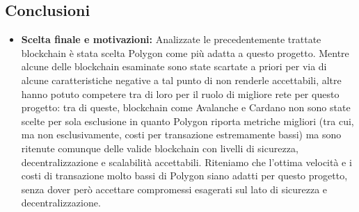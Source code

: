 \documentclass[a4paper, 12pt]{article}
\begin{document}
\subsection*{Conclusioni}
\begin{itemize}

    \item \textbf{Scelta finale e motivazioni: }
    Analizzate le precedentemente trattate blockchain è stata scelta Polygon come più adatta a questo progetto.
    Mentre alcune delle blockchain esaminate sono state scartate a priori per via di alcune caratteristiche negative a tal punto di non renderle
    accettabili, altre hanno potuto competere tra di loro per il ruolo di migliore rete per questo progetto: tra di queste, blockchain come Avalanche e Cardano
    non sono state scelte per sola esclusione in quanto Polygon riporta metriche migliori (tra cui, ma non esclusivamente, costi per transazione estremamente bassi) ma sono
    ritenute comunque delle valide blockchain con livelli di sicurezza, decentralizzazione e scalabilità accettabili.
    Riteniamo che l'ottima velocità e i costi di transazione molto bassi di Polygon siano adatti per questo progetto, senza dover però accettare
    compromessi esagerati sul lato di sicurezza e decentralizzazione.\\


\end{itemize}
\end{document}

